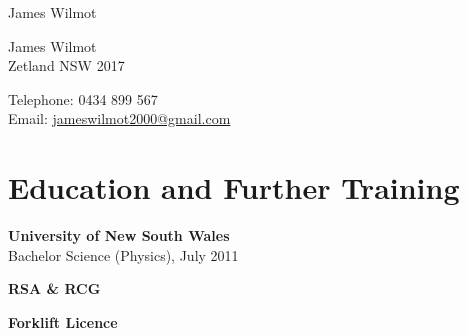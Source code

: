 \documentclass[10pt,a4paper]{article}
\def\name{James Wilmot}
\renewenvironment{itemize}{
\begin{list}{}{
\setlength{\leftmargin}{1.5em}
\setlength{\itemsep}{0.25em}
\setlength{\parskip}{0pt}
\setlength{\parsep}{0.25em}
}
}{
\end{list}
}
\begin{document}
{\huge \name}


\bigskip

\begin{minipage}[t]{0.64\textwidth}
James Wilmot \\
Zetland NSW 2017
\end{minipage}
\begin{minipage}[t]{0.36\textwidth}
Telephone: 0434 899 567 \\
Email: \href{mailto:jameswilmot2000@gmail.com}{jameswilmot2000@gmail.com} \\
\end{minipage}

\section*{Education and Further Training}
\begin{itemize}
\item \textbf{University of New South Wales} \\
Bachelor Science (Physics), July 2011

\item \textbf{RSA \& RCG}
\item \textbf{Forklift Licence}
\end{itemize}

\end{document}
